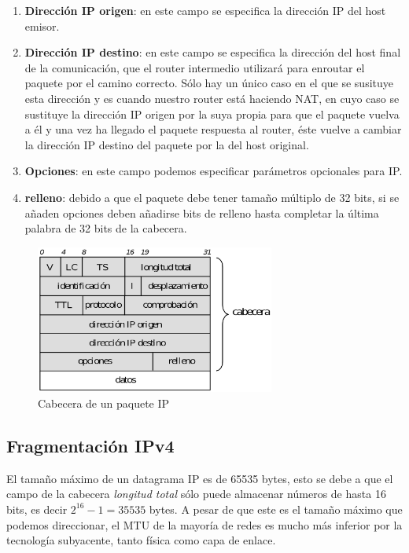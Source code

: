 \documentclass[10pt,a4paper,spanish]{report}
\begin{document}
\begin{enumerate}[\color{tema4}{$\heartsuit$}]
  \item \textcolor{tema4}{\textbf{Dirección IP origen}}: en este campo se especifica la dirección IP del host emisor.

  \item \textcolor{tema4}{\textbf{Dirección IP destino}}: en este campo se especifica la dirección del host final de la comunicación, que el router intermedio utilizará para enroutar el paquete por el camino correcto. Sólo hay un único caso en el que se susituye esta dirección y es cuando nuestro router está haciendo NAT, en cuyo caso se sustituye la dirección IP origen por la suya propia para que el paquete vuelva a él y una vez ha llegado el paquete respuesta al router, éste vuelve a cambiar la dirección IP destino del paquete por la del host original.

  \item \textcolor{tema4}{\textbf{Opciones}}: en este campo podemos especificar parámetros opcionales para IP.

  \item \textcolor{tema4}{\textbf{relleno}}: debido a que el paquete debe tener tamaño múltiplo de 32 bits, si se añaden opciones deben añadirse bits de relleno hasta completar la última palabra de 32 bits de la cabecera.
\end{enumerate}
 
\begin{figure}[!h]
  \centering
  \includegraphics[width=0.7\textwidth]{cabeceraIP}
  \caption{Cabecera de un paquete IP}
  \label{cabeceraIP}
\end{figure}

\subsection{\textcolor{tema4}Fragmentación IPv4}
El tamaño máximo de un datagrama IP es de 65535 bytes, esto se debe a que el campo de la cabecera \textit{\textcolor{tema4}{longitud total}} sólo puede almacenar números de hasta 16 bits, es decir $2^{16} - 1 = 35535$ bytes. A pesar de que este es el tamaño máximo que podemos direccionar, el MTU de la mayoría de redes es mucho más inferior por la tecnología subyacente, tanto física como capa de enlace.
\end{document}
